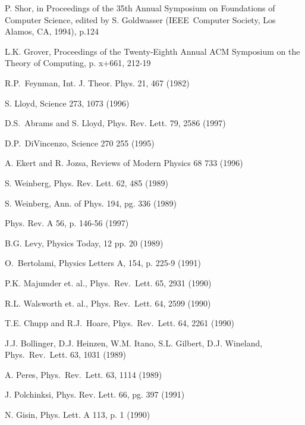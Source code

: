 \documentclass{article}
\begin{document}
\begin{thebibliography}{99}
P. Shor, in Proceedings of the 35th Annual Symposium on
Foundations of Computer Science, edited by S. Goldwasser (IEEE\ Computer
Society, Los Alamos, CA, 1994), p.124

L.K. Grover, Proceedings of the Twenty-Eighth Annual ACM
Symposium on the Theory of Computing, p. x+661, 212-19

R.P.\ Feynman, Int. J. Theor. Phys. 21, 467 (1982)

S. Lloyd, Science 273, 1073 (1996)

D.S.\ Abrams and S. Lloyd, Phys. Rev. Lett. 79, 2586 (1997)

D.P.\ DiVincenzo, Science 270 255 (1995)

A. Ekert and R. Jozsa, Reviews of Modern Physics 68 733 (1996)

S. Weinberg, Phys. Rev. Lett. 62, 485 (1989)

S. Weinberg, Ann. of Phys. 194, pg. 336 (1989)

Phys. Rev. A 56, p. 146-56 (1997)

B.G. Levy, Physics Today, 12 pp. 20 (1989)

O.\ Bertolami, Physics Letters A, 154, p. 225-9 (1991)

P.K. Majumder et. al., Phys.\ Rev.\ Lett. 65, 2931 (1990)

R.L. Walsworth et. al., Phys. Rev.\ Lett. 64, 2599 (1990)

T.E. Chupp and R.J.\ Hoare, Phys.\ Rev.\ Lett. 64, 2261 (1990)

J.J. Bollinger, D.J. Heinzen, W.M. Itano, S.L. Gilbert,
D.J. Wineland, Phys.\ Rev.\ Lett. 63, 1031 (1989)

A. Peres, Phys.\ Rev.\ Lett. 63, 1114 (1989)

J. Polchinksi, Phys. Rev. Lett. 66, pg. 397 (1991)

N. Gisin, Phys. Lett. A 113, p. 1 (1990)
\end{thebibliography}
\end{document}

